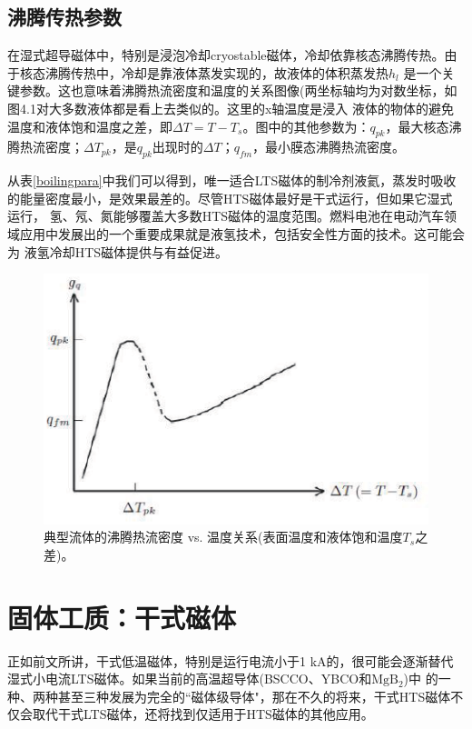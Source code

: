\subsection*{沸腾传热参数}
在湿式超导磁体中，特别是浸泡冷却cryostable磁体，冷却依靠核态沸腾传热。由于核态沸腾传热中，冷却是靠液体蒸发实现的，故液体的体积蒸发热$h_l$
是一个关键参数。这也意味着沸腾热流密度和温度的关系图像(两坐标轴均为对数坐标，如图4.1对大多数液体都是看上去类似的。这里的x轴温度是浸入
液体的物体的避免温度和液体饱和温度之差，即$\Delta T=T-T_s$。图中的其他参数为：$q_{pk}$，最大核态沸腾热流密度；$\Delta T_{pk}$，是$q_{pk}$出现时的$\Delta T$；$q_{fm}$，最小膜态沸腾热流密度。

从表\ref{boilingpara}中我们可以得到，唯一适合LTS磁体的制冷剂液氦，蒸发时吸收的能量密度最小，是效果最差的。尽管HTS磁体最好是干式运行，但如果它湿式运行，
氢、氖、氮能够覆盖大多数HTS磁体的温度范围。燃料电池在电动汽车领域应用中发展出的一个重要成果就是液氢技术，包括安全性方面的技术。这可能会为
液氢冷却HTS磁体提供与有益促进。

\begin{figure}
  \centering
 \includegraphics[scale=0.8]{chpt4/figs/fig4.1.eps}
  \caption{典型流体的沸腾热流密度 vs. 温度关系(表面温度和液体饱和温度$T_s$之差)。}
\end{figure}

\section{固体工质：干式磁体}
正如前文所讲，干式低温磁体，特别是运行电流小于1 kA的，很可能会逐渐替代湿式小电流LTS磁体。如果当前的高温超导体(BSCCO、YBCO和$\mathrm{MgB_2}$)中
的一种、两种甚至三种发展为完全的``磁体级导体"，那在不久的将来，干式HTS磁体不仅会取代干式LTS磁体，还将找到仅适用于HTS磁体的其他应用。

